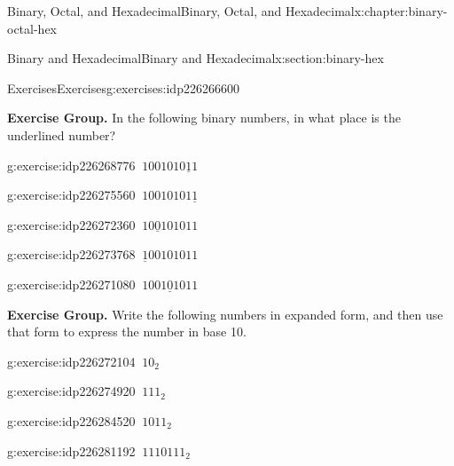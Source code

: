 \documentclass[twoside,10pt,]{book}
\numberwithin{equation}{section}
\begin{document}
\begin{chapterptx}{Binary, Octal, and Hexadecimal}{}{Binary, Octal, and Hexadecimal}{}{}{x:chapter:binary-octal-hex}
\begin{sectionptx}{Binary and Hexadecimal}{}{Binary and Hexadecimal}{}{}{x:section:binary-hex}
%
\begin{exercises-subsection}{Exercises}{}{Exercises}{}{}{g:exercises:idp226266600}
\par\medskip\noindent%
\textbf{Exercise Group.}\space\space%
In the following binary numbers, in what place is the underlined number?%
\begin{exercisegroup}
\begin{divisionexerciseeg}{1}{}{}{g:exercise:idp226268776}%
\(\ 1001010\underline{1}1\)\end{divisionexerciseeg}%
\begin{divisionexerciseeg}{2}{}{}{g:exercise:idp226275560}%
\(\ 10010101\underline{1}\)\end{divisionexerciseeg}%
\begin{divisionexerciseeg}{3}{}{}{g:exercise:idp226272360}%
\(\ 10\underline{0}101011\)\end{divisionexerciseeg}%
\begin{divisionexerciseeg}{4}{}{}{g:exercise:idp226273768}%
\(\ \underline{1}00101011\)\end{divisionexerciseeg}%
\begin{divisionexerciseeg}{5}{}{}{g:exercise:idp226271080}%
\(\ 1001\underline{0}1011\)\end{divisionexerciseeg}%
\end{exercisegroup}
\par\medskip\noindent
\par\medskip\noindent%
\textbf{Exercise Group.}\space\space%
Write the following numbers in expanded form, and then use that form to express the number in base 10.%
\begin{exercisegroup}
\begin{divisionexerciseeg}{6}{}{}{g:exercise:idp226272104}%
\(\ 10_2\)\end{divisionexerciseeg}%
\begin{divisionexerciseeg}{7}{}{}{g:exercise:idp226274920}%
\(\ 111_2\)\end{divisionexerciseeg}%
\begin{divisionexerciseeg}{8}{}{}{g:exercise:idp226284520}%
\(\ 1011_2\)\end{divisionexerciseeg}%
\begin{divisionexerciseeg}{9}{}{}{g:exercise:idp226281192}%
\(\ 1110111_2\)\end{divisionexerciseeg}%
\end{exercisegroup}
\par\medskip\noindent
\par\medskip\noindent%

\end{exercises-subsection}
\end{sectionptx}
\end{chapterptx}
\end{document}
